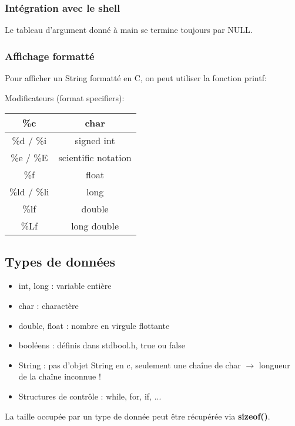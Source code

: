 \documentclass{article}
\newcommand{\insertslide}[2]{
\begin{center}
    \fbox{\texttt{[image: \#1]}}
\end{center}
}
\begin{document}
        \subsubsection{Intégration avec le shell}
            \insertslide{Slides/CM2.pdf}{15}
            Le tableau d'argument donné à main se termine toujours par NULL.
        
        \subsubsection{Affichage formatté}
            Pour afficher un String formatté en C, on peut utiliser la fonction printf:
            \insertslide{Slides/CM2.pdf}{16}
            Modificateurs (format specifiers):\\
            \begin{tabular}{|c|c|}
                \hline
                \%c & char \\
                \hline
                \%d / \%i & signed int \\
                \hline
                \%e / \%E & scientific notation \\
                \hline
                \%f & float \\
                \hline
                \%ld / \%li & long \\
                \hline
                \%lf & double \\
                \hline
                \%Lf & long double \\
                \hline
            \end{tabular}
    \subsection{Types de données}
        \begin{itemize}
            \item int, long : variable entière
            \item char : charactère
            \item double, float : nombre en virgule flottante
            \item booléens : définis dans stdbool.h, true ou false
            \item String : pas d'objet String en c, 
            seulement une chaîne de char $\rightarrow$ longueur de la chaîne inconnue !
            \item Structures de contrôle : while, for, if, ...
        \end{itemize}
        La taille occupée par un type de donnée peut être récupérée via \textbf{sizeof()}.
\end{document}

